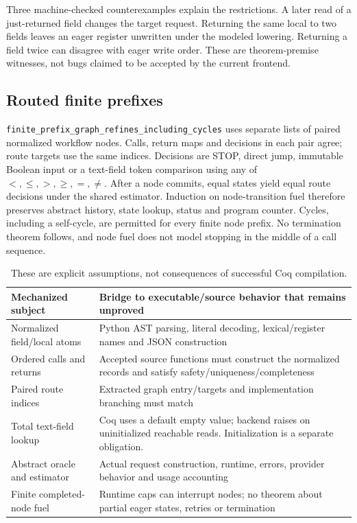 \documentclass[11pt,a4paper]{article}
\newcommand{\cp}[1]{\nolinkurl{#1}}
\begin{document}
Three machine-checked counterexamples explain the restrictions. A later read of a just-returned field changes the target request. Returning the same local to two fields leaves an eager register unwritten under the modeled lowering. Returning a field twice can disagree with eager write order. These are theorem-premise witnesses, not bugs claimed to be accepted by the current frontend.

\subsection{Routed finite prefixes}
\cp{finite_prefix_graph_refines_including_cycles} uses separate lists of paired normalized workflow nodes. Calls, return maps and decisions in each pair agree; route targets use the same indices. Decisions are STOP, direct jump, immutable Boolean input or a text-field token comparison using any of $<,\leq,>,\geq,=,\neq$. After a node commits, equal states yield equal route decisions under the shared estimator. Induction on node-transition fuel therefore preserves abstract history, state lookup, status and program counter. Cycles, including a self-cycle, are permitted for every finite node prefix. No termination theorem follows, and node fuel does not model stopping in the middle of a call sequence.

\begin{table}[h]
\small
\begin{tabularx}{\textwidth}{@{}>{\raggedright\arraybackslash}p{3.4cm} >{\raggedright\arraybackslash}X@{}}
\toprule
Mechanized subject & Bridge to executable/source behavior that remains unproved \\
\midrule
Normalized field/local atoms & Python AST parsing, literal decoding, lexical/register names and JSON construction \\
Ordered calls and returns & Accepted source functions must construct the normalized records and satisfy safety/uniqueness/completeness \\
Paired route indices & Extracted graph entry/targets and implementation branching must match \\
Total text-field lookup & Coq uses a default empty value; backend raises on uninitialized reachable reads. Initialization is a separate obligation. \\
Abstract oracle and estimator & Actual request construction, runtime, errors, provider behavior and usage accounting \\
Finite completed-node fuel & Runtime caps can interrupt nodes; no theorem about partial eager states, retries or termination \\
\bottomrule
\end{tabularx}
\caption{These are explicit assumptions, not consequences of successful Coq compilation.}
\end{table}
\end{document}
